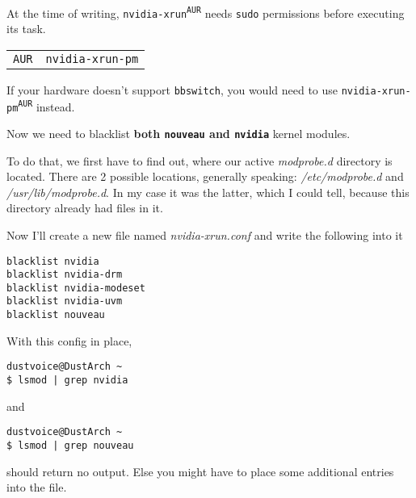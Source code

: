 \documentclass[9pt]{report}
\newenvironment{NOTE}
{\begin{tcolorbox}[colback=admonitionBG,coltitle=draculaFG,colframe=draculaBlue,colbacktitle=draculaBlue,title=NOTE]}
{\end{tcolorbox}}
\newenvironment{IMPORTANT}
{\begin{tcolorbox}[colback=admonitionBG,coltitle=draculaFG,colframe=draculaRed,colbacktitle=draculaRed,title=IMPORTANT]}
{\end{tcolorbox}}
\newenvironment{packagetable}
{\begin{longtabu}to \textwidth [b]{X[1,r]|X[1,l]}}
{\end{longtabu}}
\begin{document}
\begin{IMPORTANT}
    At the time of writing, \texttt{nvidia-xrun\textsuperscript{\texttt{AUR}}} needs \texttt{sudo} permissions before executing its task.

\end{IMPORTANT}
\begin{NOTE}
    \begin{packagetable}
        \texttt{AUR} & \texttt{nvidia-xrun-pm} \\ 
    \end{packagetable}

    If your hardware doesn’t support \texttt{bbswitch}, you would need to use \texttt{nvidia-xrun-pm\textsuperscript{\texttt{AUR}}} instead.

\end{NOTE}
Now we need to blacklist \textbf{both \texttt{nouveau} and \texttt{nvidia}} kernel modules.


To do that, we first have to find out, where our active \textit{modprobe.d} directory is located.
There are 2 possible locations, generally speaking: \textit{/etc/modprobe.d} and \textit{/usr/lib/modprobe.d}.
In my case it was the latter, which I could tell, because this directory already had files in it.


Now I’ll create a new file named \textit{nvidia-xrun.conf} and write the following into it


\begin{verbatim}
blacklist nvidia
blacklist nvidia-drm
blacklist nvidia-modeset
blacklist nvidia-uvm
blacklist nouveau
\end{verbatim}

With this config in place,


\begin{verbatim}
dustvoice@DustArch ~
$ lsmod | grep nvidia
\end{verbatim}

and


\begin{verbatim}
dustvoice@DustArch ~
$ lsmod | grep nouveau
\end{verbatim}

should return no output.
Else you might have to place some additional entries into the file.
\end{document}
